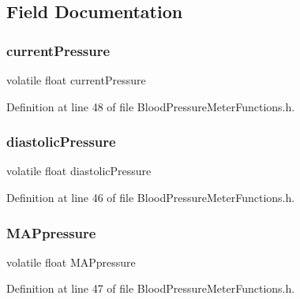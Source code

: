 \subsection{Field Documentation}
\mbox{\label{structpulse_wave___a375a42b884bc8ffbb701178874ed799e_a375a42b884bc8ffbb701178874ed799e}} 
\subsubsection{\texorpdfstring{currentPressure}{currentPressure}}
{\footnotesize\ttfamily volatile float current\+Pressure}



Definition at line 48 of file Blood\+Pressure\+Meter\+Functions.\+h.

\mbox{\label{structpulse_wave___a176133183fbe40e99e3113eca9e6dad6_a176133183fbe40e99e3113eca9e6dad6}} 
\subsubsection{\texorpdfstring{diastolicPressure}{diastolicPressure}}
{\footnotesize\ttfamily volatile float diastolic\+Pressure}



Definition at line 46 of file Blood\+Pressure\+Meter\+Functions.\+h.

\mbox{\label{structpulse_wave___a79065e37578a892272686efcd694d059_a79065e37578a892272686efcd694d059}} 
\subsubsection{\texorpdfstring{MAPpressure}{MAPpressure}}
{\footnotesize\ttfamily volatile float M\+A\+Ppressure}



Definition at line 47 of file Blood\+Pressure\+Meter\+Functions.\+h.

